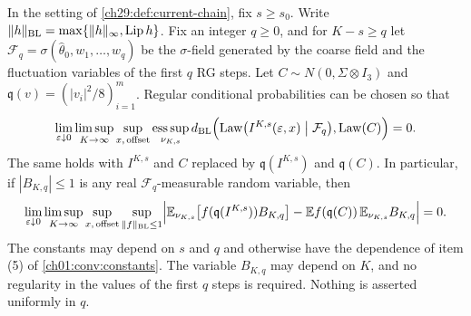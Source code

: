 \begin{lemma}\label{ch29:lem:fixed-prefix-current-mixing}
In the setting of \cref{ch29:def:current-chain}, fix $s\ge s_0$. Write $\|h\|_{\rm BL}=\max\{\|h\|_\infty,\operatorname{Lip} h\}$. Fix an integer $q\ge0$, and for $K-s\ge q$ let $\mathcal F_q=\sigma(\widehat\theta_0,w_1,\dots,w_q)$ be the $\sigma$-field generated by the coarse field and the fluctuation variables of the first $q$ RG steps. Let $C\sim N(0,\Sigma\otimes I_3)$ and $\mathfrak q(v)=(|v_i|^2/8)_{i=1}^m$. Regular conditional probabilities can be chosen so that
\begin{equation}\label{ch29:eq:conditional-prefix-gaussian}
 \lim_{\varepsilon\downarrow0}\limsup_{K\to\infty}\sup_{x,\,\text{offset}}\operatorname*{ess\,sup}_{\nu_{K,s}}d_{\mathrm{BL}}\Bigl(\operatorname{Law}\bigl(I^{K,s}(\varepsilon,x)\bigm|\mathcal F_q\bigr),\operatorname{Law}(C)\Bigr)=0.
\end{equation}
The same holds with $I^{K,s}$ and $C$ replaced by $\mathfrak q(I^{K,s})$ and $\mathfrak q(C)$. In particular, if $|B_{K,q}|\le1$ is any real $\mathcal F_q$-measurable random variable, then
\begin{equation}\label{ch29:eq:prefix-bounded-multiplier}
 \lim_{\varepsilon\downarrow0}\limsup_{K\to\infty}\sup_{x,\,\text{offset}}\sup_{\|f\|_{\rm BL}\le1}\Bigl|\mathbb E_{\nu_{K,s}}\bigl[f(\mathfrak q(I^{K,s}))B_{K,q}\bigr]-\mathbb E f(\mathfrak q(C))\,\mathbb E_{\nu_{K,s}}B_{K,q}\Bigr|=0.
\end{equation}
The constants may depend on $s$ and $q$ and otherwise have the dependence of item (5) of \cref{ch01:conv:constants}. The variable $B_{K,q}$ may depend on $K$, and no regularity in the values of the first $q$ steps is required. Nothing is asserted uniformly in $q$.
\end{lemma}

